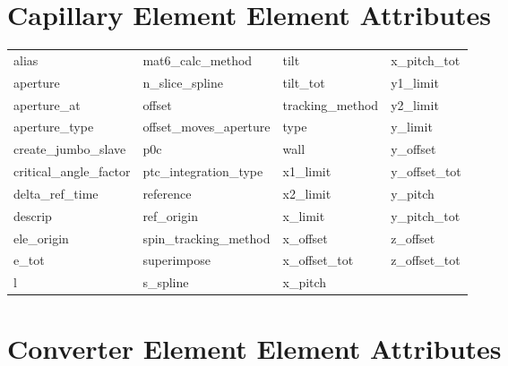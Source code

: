  \section{Capillary Element Element Attributes}
 \label{s:list.capillary}
 
 \begin{tabular}{llll} \toprule
alias                       & mat6_calc_method            & tilt                        & x_pitch_tot                 \\
aperture                    & n_slice_spline              & tilt_tot                    & y1_limit                    \\
aperture_at                 & offset                      & tracking_method             & y2_limit                    \\
aperture_type               & offset_moves_aperture       & type                        & y_limit                     \\
create_jumbo_slave          & p0c                         & wall                        & y_offset                    \\
critical_angle_factor       & ptc_integration_type        & x1_limit                    & y_offset_tot                \\
delta_ref_time              & reference                   & x2_limit                    & y_pitch                     \\
descrip                     & ref_origin                  & x_limit                     & y_pitch_tot                 \\
ele_origin                  & spin_tracking_method        & x_offset                    & z_offset                    \\
e_tot                       & superimpose                 & x_offset_tot                & z_offset_tot                \\
l                           & s_spline                    & x_pitch                     &                             \\
 \bottomrule
 \end{tabular}
 \vfill
 
 \section{Converter Element Element Attributes}
 \label{s:list.converter}
 
